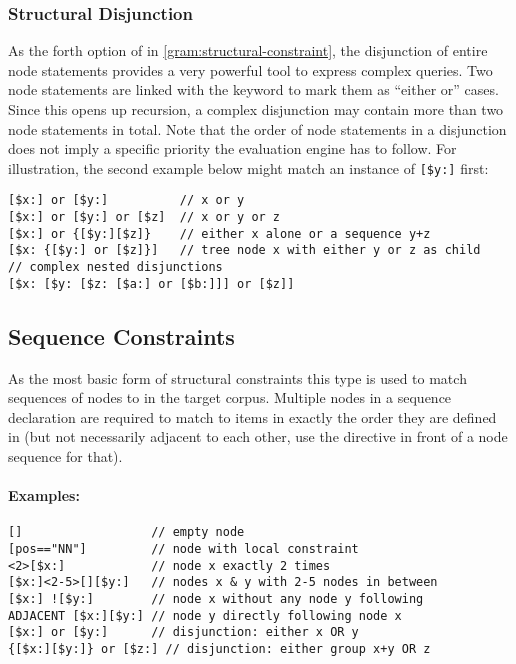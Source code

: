 \documentclass[11pt,a4paper]{report}
\begin{document}
\subsubsection{Structural Disjunction}
\label{sec:structural-disjunction}
\noindent As the forth option of  in \cref{gram:structural-constraint}, the disjunction of entire node statements provides a very powerful tool to express complex queries.
Two node statements are linked with the  keyword to mark them as ``either or'' cases.
Since this opens up recursion, a complex disjunction may contain more than two node statements in total.
Note that the order of node statements in a disjunction does not imply a specific priority the evaluation engine has to follow.
For illustration, the second example below might match an instance of \verb|[$y:]| first:
\begin{Verbatim}[samepage=true]
[$x:] or [$y:]          // x or y
[$x:] or [$y:] or [$z]  // x or y or z
[$x:] or {[$y:][$z]}    // either x alone or a sequence y+z
[$x: {[$y:] or [$z]}]   // tree node x with either y or z as child
// complex nested disjunctions
[$x: [$y: [$z: [$a:] or [$b:]]] or [$z]]
\end{Verbatim}

\subsection{Sequence Constraints}
\label{sec:sequence-constraints}

As the most basic form of structural constraints this type is used to match sequences of nodes to  in the target corpus.
Multiple nodes in a sequence declaration are required to match to items in exactly the order they are defined in (but not necessarily adjacent to each other, use the  directive in front of a node sequence for that).

\paragraph{Examples:}

\begin{Verbatim}[samepage=true]
[]                  // empty node
[pos=="NN"]         // node with local constraint
<2>[$x:]            // node x exactly 2 times       
[$x:]<2-5>[][$y:]   // nodes x & y with 2-5 nodes in between
[$x:] ![$y:]        // node x without any node y following
ADJACENT [$x:][$y:] // node y directly following node x
[$x:] or [$y:]      // disjunction: either x OR y
{[$x:][$y:]} or [$z:] // disjunction: either group x+y OR z
\end{Verbatim}
\end{document}
